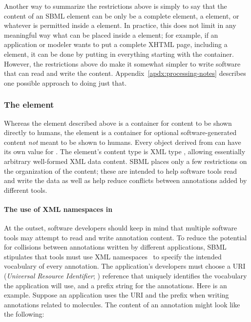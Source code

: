 Another way to summarize the restrictions above is simply to say
that the content of an SBML  element can be only be a
complete  element, a  element, or whatever
is permitted inside a  element.  In practice, this
does not limit in any meaningful way what can be placed inside a
 element; for example, if an application or modeler
wants to put a complete XHTML page, including a 
element, it can be done by putting in everything starting with the
 container.  However, the restrictions above do make
it somewhat simpler to write software that can read and write the
 content.  Appendix~\ref{apdx:processing-notes}
describes one possible approach to doing just that.


\subsubsection{The  element}
\label{sec:annotation-use}

Whereas the  element described above is a container for
content to be shown directly to humans, the 
element is a container for optional software-generated content
\emph{not} meant to be shown to humans.  Every object derived
from \SBase can have its own value for .  The
element's content type is XML type , allowing essentially
arbitrary well-formed XML data content.  SBML places only a few restrictions on
the organization of the content; these are intended to help
software tools read and write the data as well as help reduce
conflicts between annotations added by different tools.


\paragraph{The use of XML namespaces in }


At the outset, software developers should keep in mind that
multiple software tools may attempt to read and write annotation
content.  To reduce the potential for collisions between
annotations written by different applications, SBML \thisLV
stipulates that tools must use XML namespaces~\citep{bray:1999} to
specify the intended vocabulary of every annotation.  The
application's developers must choose a URI (\emph{Universal
  Resource Identifier}; \citealt{harold:2001,w3c:2000}) reference
that uniquely identifies the vocabulary the application will use,
and a prefix string for the annotations.  Here is an example.
Suppose an application uses the URI 
and the prefix  when writing annotations related to 
molecules.  The content of an annotation might look like the
following:


